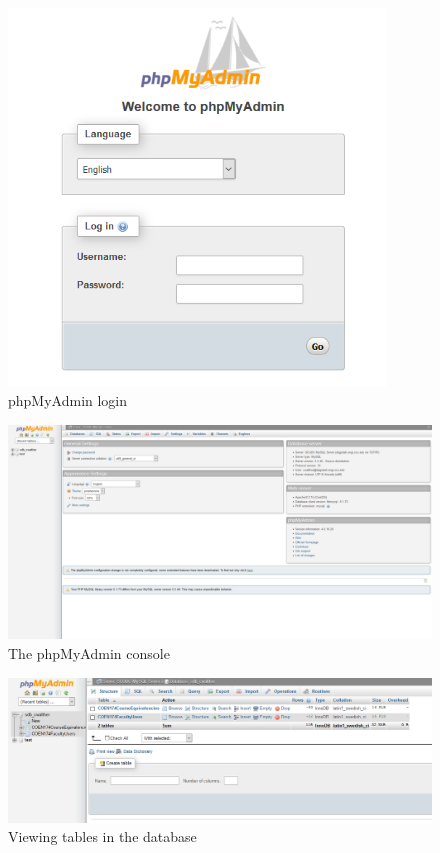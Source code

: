 \documentclass{article}
\begin{document}
\begin{figure}[h]
\includegraphics[width=10cm]{phpmyadminlogin}
\centering
\caption{phpMyAdmin login}
\label{fig:phpmyadminlogin}
\end{figure}

\begin{figure}[h]
\includegraphics[width=15cm]{phpmyadmin}
\centering
\caption{The phpMyAdmin console}
\label{fig:phpmyadmin}
\end{figure}

\begin{figure}[h]
\includegraphics[width=15cm]{dbview}
\centering
\caption{Viewing tables in the database}
\label{fig:dbview}
\end{figure}
\end{document}
